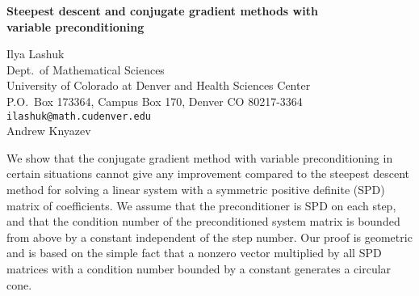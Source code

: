 \documentclass{report}
\begin{document}

\begin{center}
{\large
{\bf Steepest descent and conjugate gradient methods with \\
	variable preconditioning}}

	Ilya Lashuk \\
	Dept.~of Mathematical Sciences \\
	University of Colorado at Denver and Health Sciences Center \\
	P.O.~Box 173364, Campus Box 170, Denver CO 80217-3364 \\
	{\tt ilashuk@math.cudenver.edu} \\
	Andrew Knyazev
\end{center}
We show that the conjugate gradient method with variable
preconditioning in certain situations cannot give any
improvement compared to the steepest descent method for
solving a linear system with a symmetric positive definite
(SPD) matrix of coefficients. We assume that the
preconditioner is SPD on each step, and that the condition
number of the preconditioned system matrix is bounded from
above by a constant independent of the step number. Our
proof is geometric and is based on the simple fact that a
nonzero vector multiplied by all SPD matrices with a
condition number bounded by a constant generates a circular
cone.



\end{document}
